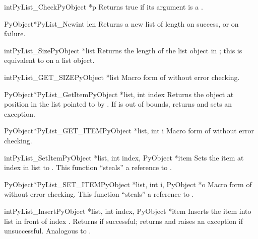 \documentclass{manual}
\begin{document}
\begin{cfuncdesc}{int}{PyList_Check}{PyObject *p}
Returns true if its argument is a .
\end{cfuncdesc}

\begin{cfuncdesc}{PyObject*}{PyList_New}{int len}
Returns a new list of length  on success, or \NULL{} on
failure.
\end{cfuncdesc}

\begin{cfuncdesc}{int}{PyList_Size}{PyObject *list}
Returns the length of the list object in ; this is
equivalent to  on a list object.
\end{cfuncdesc}

\begin{cfuncdesc}{int}{PyList_GET_SIZE}{PyObject *list}
Macro form of  without error checking.
\end{cfuncdesc}

\begin{cfuncdesc}{PyObject*}{PyList_GetItem}{PyObject *list, int index}
Returns the object at position  in the list pointed
to by .  If  is out of bounds, returns \NULL{} and
sets an  exception.
\end{cfuncdesc}

\begin{cfuncdesc}{PyObject*}{PyList_GET_ITEM}{PyObject *list, int i}
Macro form of  without error checking.
\end{cfuncdesc}

\begin{cfuncdesc}{int}{PyList_SetItem}{PyObject *list, int index,
                                       PyObject *item}
Sets the item at index  in list to .
  This function ``steals'' a reference to .
\end{cfuncdesc}

\begin{cfuncdesc}{PyObject*}{PyList_SET_ITEM}{PyObject *list, int i,
                                              PyObject *o}
Macro form of  without error checking.
  This function ``steals'' a reference to .
\end{cfuncdesc}

\begin{cfuncdesc}{int}{PyList_Insert}{PyObject *list, int index,
                                      PyObject *item}
Inserts the item  into list  in front of index
.  Returns  if successful; returns  and
raises an exception if unsuccessful.  Analogous to
.
\end{cfuncdesc}
\end{document}
